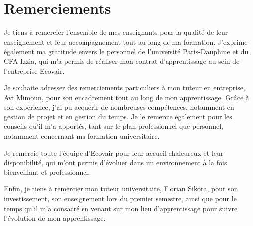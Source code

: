\section*{Remerciements}
Je tiens à remercier l’ensemble de mes enseignants pour la qualité de leur enseignement et leur accompagnement tout au long de ma formation. J’exprime également ma gratitude envers le personnel de l’université Paris-Dauphine et du CFA Izzia, qui m’a permis de réaliser mon contrat d’apprentissage au sein de l’entreprise Ecovair.

Je souhaite adresser des remerciements particuliers à mon tuteur en entreprise, Avi Mimoun, pour son encadrement tout au long de mon apprentissage. Grâce à son expérience, j’ai pu acquérir de nombreuses compétences, notamment en gestion de projet et en gestion du temps. Je le remercie également pour les conseils qu’il m’a apportés, tant sur le plan professionnel que personnel, notamment concernant ma formation universitaire.

Je remercie toute l’équipe d’Ecovair pour leur accueil chaleureux et leur disponibilité, qui m’ont permis d’évoluer dans un environnement à la fois bienveillant et professionnel.

Enfin, je tiens à remercier mon tuteur universitaire, Florian Sikora, pour son investissement, son enseignement lors du premier semestre, ainsi que pour le temps qu’il m’a consacré en venant sur mon lieu d’apprentissage pour suivre l’évolution de mon apprentissage.